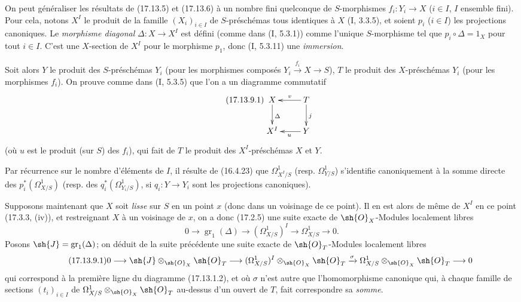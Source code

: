 \begin{env}[17.13.9]
\label{IV.17.13.9}
On peut généraliser les résultats de (17.13.5) et (17.13.6) à un nombre fini quelconque de $S$-morphismes $f_i:Y_i\to X$ ($i\in I$, $I$ ensemble fini). Pour cela, notons $X^I$ le produit de la famille $(X_i)_{i\in I}$ de $S$-préschémas tous identiques à $X$ (I, 3.3.5), et soient $p_i$ ($i\in I$) les projections canoniques. Le \emph{morphisme diagonal} $\Delta:X\to X^I$ est défini (comme dans (I, 5.3.1)) comme l'unique $S$-morphisme tel que $p_i\circ\Delta=1_X$ pour tout $i\in I$. C'est une $X$-section de $X^I$ pour le morphisme $p_1$, donc (I, 5.3.11) une \emph{immersion}.


Soit alors $Y$ le produit des $S$-préschémas $Y_i$ (pour les morphismes composés $Y_i\xrightarrow{f_i}X\to S$), $T$ le produit des $X$-préschémas $Y_i$ (pour les morphismes $f_i$). On prouve comme dans (I, 5.3.5) que l'on a un diagramme commutatif
\[
\label{IV.17.13.9.1}
\tag{17.13.9.1}
\xymatrix{
  X \ar[d]^{\Delta} & T \ar[l]_-v \ar[d]^{j}\\
  X^I & Y \ar[l]^{u}
}
\]
(où $u$ est le produit (sur $S$) des $f_i$), qui fait de $T$ le produit des $X^I$-préschémas $X$ et $Y$.

Par récurrence sur le nombre d'éléments de $I$, il résulte de (16.4.23) que $\Omega^1_{X^I/S}$ (resp. $\Omega^1_{Y/S}$) s'identifie canoniquement à la somme directe des $p_i^*(\Omega^1_{X/S})$ (resp. des $q_i^*(\Omega^1_{Y_i/S})$, si $q_i:Y\to Y_i$ sont les projections canoniques).

Supposons maintenant que $X$ soit \emph{lisse} sur $S$ en un point $x$ (donc dans un voisinage de ce point). Il en est alors de même de $X^I$ en ce point (17.3.3, (iv)), et restreignant $X$ à un voisinage de $x$, on a donc (17.2.5) une suite exacte de $\sh{O}_X$-Modules localement libres
\[
0\to\operatorname{gr}_1(\Delta)\to(\Omega^1_{X/S})^I\to\Omega^1_{X/S}\to0.
\]
Posons $\sh{J}=\operatorname{gr}_1(\Delta)$; on déduit de la suite précédente une suite exacte de $\sh{O}_T$-Modules localement libres
\[
\label{IV.17.13.9.1-seq}
\tag{17.13.9.1}
0\to\sh{J}\otimes_{\sh{O}_X}\sh{O}_T\to(\Omega^1_{X/S})^I\otimes_{\sh{O}_X}\sh{O}_T\xrightarrow{\sigma}\Omega^1_{X/S}\otimes_{\sh{O}_X}\sh{O}_T\to0
\]
qui correspond à la première ligne du diagramme (17.13.1.2), et où $\sigma$ n'est autre que l'homomorphisme canonique qui, à chaque famille de sections $(t_i)_{i\in I}$ de $\Omega^1_{X/S}\otimes_{\sh{O}_X}\sh{O}_T$ au-dessus d'un ouvert de $T$, fait correspondre sa \emph{somme}.


\end{env}
